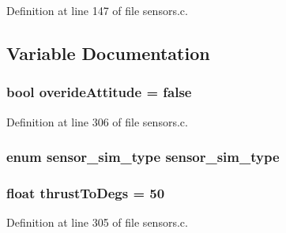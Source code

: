 \-Definition at line 147 of file sensors.\-c.



\subsection{\-Variable \-Documentation}
\hypertarget{group___sensors_ga4003f7985e24e407bbc2f44b2d289c29}{
\subsubsection[{overide\-Attitude}]{\setlength{\rightskip}{0pt plus 5cm}bool {\bf overide\-Attitude} = false}}\label{group___sensors_ga4003f7985e24e407bbc2f44b2d289c29}


\-Definition at line 306 of file sensors.\-c.

\hypertarget{group___sensors_gaa5e76bc9bc1cc20d2b183069aea687b4}{
\subsubsection[{sensor\-\_\-sim\-\_\-type}]{\setlength{\rightskip}{0pt plus 5cm}enum {\bf sensor\-\_\-sim\-\_\-type}  {\bf sensor\-\_\-sim\-\_\-type}}}\label{group___sensors_gaa5e76bc9bc1cc20d2b183069aea687b4}
\hypertarget{group___sensors_ga0bfc1acfbf1c0b59ebaeba678cb8c811}{
\subsubsection[{thrust\-To\-Degs}]{\setlength{\rightskip}{0pt plus 5cm}float {\bf thrust\-To\-Degs} = 50}}\label{group___sensors_ga0bfc1acfbf1c0b59ebaeba678cb8c811}


\-Definition at line 305 of file sensors.\-c.

